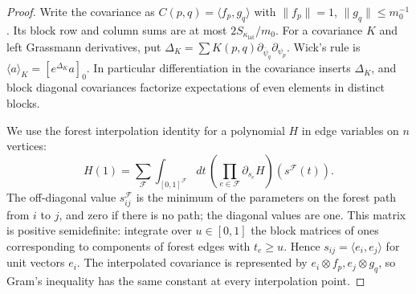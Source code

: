 \documentclass[11pt,letterpaper,reqno]{amsart}
\theoremstyle{definition}
\theoremstyle{remark}
\begin{document}
\begin{proof}
Write the covariance as $C(p,q)=\langle f_p,g_q\rangle$ with
$\|f_p\|=1$, $\|g_q\|\le m_0^{-1}$. Its block row and
column sums are at most $2S_{\kappa_{\mathrm{lat}}}/m_0$.
For a covariance $K$ and left Grassmann derivatives, put
$\Delta_K=\sum K(p,q)\partial_{\bar\psi_q}\partial_{\psi_p}$.
Wick's rule is $\langle a\rangle_K=[e^{\Delta_K}a]_0$.
In particular differentiation in the covariance inserts
$\Delta_{\dot K}$, and block diagonal covariances factorize
expectations of even elements in distinct blocks.

We use the forest interpolation identity
\cite[Thm.~III.1]{AbdesselamRivasseau1994} for a polynomial $H$ in
edge variables on $n$ vertices:
\begin{equation}\label{C-386-51}
 H(1)=\sum_{\mathcal F}\int_{[0,1]^{\mathcal F}}dt\,
       \left(\prod_{e\in\mathcal F}\partial_{s_e}H\right)
                                      (s^{\mathcal F}(t)).
\end{equation}
The off-diagonal value $s^{\mathcal F}_{ij}$ is the minimum of
the parameters on the forest path from $i$ to $j$, and zero if
there is no path; the diagonal values are one. This matrix is
positive semidefinite: integrate over $u\in[0,1]$ the block
matrices of ones corresponding to components of forest edges
with $t_e\ge u$. Hence $s_{ij}=\langle e_i,e_j\rangle$ for
unit vectors $e_i$. The interpolated covariance is represented
by $e_i\otimes f_p,e_j\otimes g_q$, so Gram's inequality
has the same constant at every interpolation point.


\end{proof}
\end{document}
